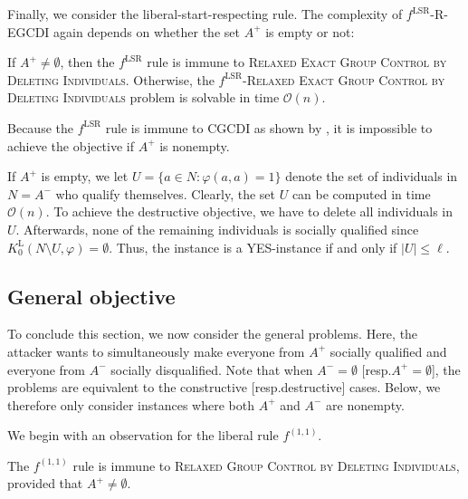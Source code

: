 \documentclass[
    12pt,               %
    a4paper,            %
    bibtotoc,           %
    pointlessnumbers,   %
    ngerman,            %
    titlepage,          %
    leqno,              %
    ]{scrarticle}       %
\begin{document}
Finally, we consider the liberal-start-respecting rule. The complexity of $f^{\text{LSR}}$-R-EGCDI again depends on whether the set $A^+$ is empty or not:

\begin{Observation} \label{obs:lsr_regcdi_i_p}
If $A^+ \neq \emptyset$, then the $f^{\text{LSR}}$ rule is immune to \textsc{Relaxed Exact Group Control by Deleting Individuals}. Otherwise, the $f^{\text{LSR}}$-\textsc{Relaxed Exact Group Control by Deleting Individuals} problem is solvable in time $\mathcal{O}(n)$.
\end{Observation}

\begin{Proof}
Because the $f^{\text{LSR}}$ rule is immune to CGCDI as shown by \textcite[Theorem 7]{YD18}, it is impossible to achieve the objective if $A^+$ is nonempty.

If $A^+$ is empty, we let $U = \{ a \in N : \varphi(a, a) = 1 \}$ denote the set of individuals in $N = A^-$ who qualify themselves. Clearly, the set $U$ can be computed in time $\mathcal{O}(n)$. To achieve the destructive objective, we have to delete all individuals in $U$. Afterwards, none of the remaining individuals is socially qualified since $K^{\text{L}}_0(N \setminus U, \varphi) = \emptyset$. Thus, the instance is a YES-instance if and only if $|U| \leq \ell$.
\end{Proof}



\clearpage

\subsection{General objective}

To conclude this section, we now consider the general problems. Here, the attacker wants to simultaneously make everyone from $A^+$ socially qualified and everyone from $A^-$ socially disqualified. Note that when $A^- = \emptyset$ [resp.\@ $A^+ = \emptyset$], the problems are equivalent to the constructive [resp.\@ destructive] cases. Below, we therefore only consider instances where both $A^+$ and $A^-$ are nonempty.



We begin with an observation for the liberal rule $f^{(1, 1)}$.

\begin{Observation} \label{obs:f11_rgcdi_i}
The $f^{(1, 1)}$ rule is immune to \textsc{Relaxed Group Control by Deleting Individuals}, provided that $A^+ \neq \emptyset$.
\end{Observation}
\end{document}
